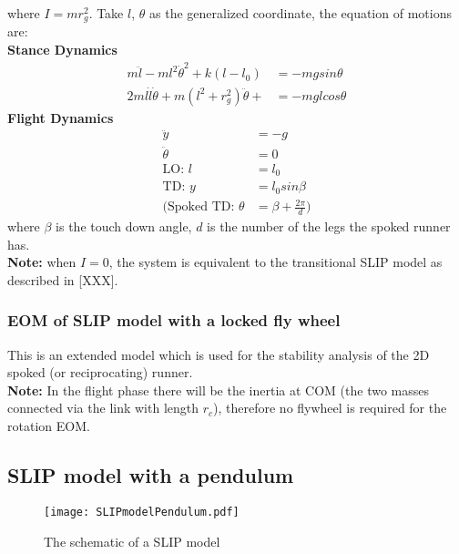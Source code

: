 \noindent
where $I = mr_g^2$. Take $l$, $\theta$ as the generalized coordinate, the equation of motions are:\\
\noindent
\textbf {Stance Dynamics}
\begin{align*}
m\ddot{l} - ml^2\dot{\theta}^2 + k(l-l_0) &= -mgsin\theta\\
2ml\dot l \dot{\theta} + m(l^2+r_g^2)\ddot{\theta} +   &= -mglcos\theta
\end{align*}
\noindent
\textbf {Flight Dynamics}
\begin{align*}
\ddot y &= -g\\
\ddot \theta &= 0\\
\text{LO: } l &= l_0\\
\text{TD: } y &= l_0sin\beta\\
\text{(Spoked TD: } \theta &= \beta + \frac{2\pi}{d}\text{)}
\end{align*}
where $\beta$ is the touch down angle, $d$ is the number of the legs the spoked runner has.\\
\textbf{Note:} when $I = 0$, the system is equivalent to the transitional SLIP model as described in [XXX].



\subsubsection{EOM of SLIP model with a locked fly wheel}
This is an extended model which is used for the stability analysis of the 2D spoked (or reciprocating) runner.\\
\textbf{Note:} In the flight phase there will be the inertia at COM (the two masses connected via the link with length $r_c$), therefore no flywheel is required for the rotation EOM.


\subsection{SLIP model with a pendulum}
\begin{figure}[h]
\centering

\texttt{[image: SLIPmodelPendulum.pdf]}
\caption{The schematic of a SLIP model }
\label{fig.SLIPmodelPendulum}
\end{figure}

